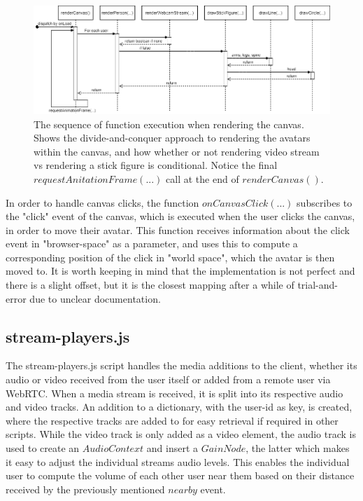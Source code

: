 \begin{figure}[H]
    \centering
    \includegraphics[width=\textwidth]{Pictures/RenderCanvas.png}
    \caption{The sequence of function execution when rendering the canvas. Shows the divide-and-conquer approach to rendering the avatars within the canvas, and how whether or not rendering video stream vs rendering a stick figure is conditional. Notice the final $requestAnitationFrame(...)$ call at the end of $renderCanvas()$.}
    \label{fig:rendercanvas}
\end{figure}

In order to handle canvas clicks, the function $onCanvasClick(...)$ subscribes to the "click" event of the canvas, which is executed when the user clicks the canvas, in order to move their avatar. This function receives information about the click event in "browser-space" as a parameter, and uses this to compute a corresponding position of the click in "world space", which the avatar is then moved to. It is worth keeping in mind that the implementation is not perfect and there is a slight offset, but it is the closest mapping after a while of trial-and-error due to unclear documentation.

\subsection{stream-players.js}
The stream-players.js script handles the media additions to the client, whether its audio or video received from the user itself or added from a remote user via WebRTC. When a media stream is received, it is split into its respective audio and video tracks. An addition to a dictionary, with the user-id as key, is created, where the respective tracks are added to for easy retrieval if required in other scripts. While the video track is only added as a video element, the audio track is used to create an $AudioContext$ and insert a $GainNode$, the latter which makes it easy to adjust the individual streams audio levels. This enables the individual user to compute the volume of each other user near them based on their distance received by the previously mentioned $nearby$ event.

